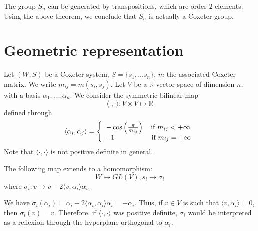 \begin{example}
The group $S_n$ can be generated by transpositions, which are order $2$ elements. Using the above theorem, we conclude that $S_n$ is actually a Coxeter group.
\end{example}

\section{Geometric representation}

Let $(W, S)$ be a Coxeter system, $S = \{s_1, \ldots s_n \}$, $m$ the associated Coxeter matrix. We write $m_{ij} = m(s_i, s_j)$. Let $V$ be a $\mathbb{R}$-vector space of dimension $n$, with a basis $\alpha_1, \ldots , \alpha_n$. We consider the symmetric bilinear map
\begin{equation}
\langle \cdot, \cdot \rangle : V \times V \mapsto \mathbb{R}
\end{equation} defined through
\begin{equation}
\langle \alpha_i , \alpha_j \rangle = \left \{
\begin{array}{c @{} c}
    &- \cos \left(\frac{\pi}{m_{ij}} \right) \quad \text{if } m_{ij} < + \infty \\
    &-1 \quad ~~~~~~~~~~~~~\text{if } m_{ij} = + \infty \\
\end{array}
\right.
\end{equation} Note that $\langle \cdot, \cdot \rangle$ is not positive definite in general.

\begin{proposition}
The following map extends to a homomorphism:
\begin{equation}
W \mapsto GL(V), s_i \to \sigma_i
\end{equation} where $\sigma_i :v \to  v - 2 \langle v, \alpha_i \rangle \alpha_i$.
\end{proposition}

\begin{remark}
We have $\sigma_i (\alpha_i) = \alpha_i - 2 \langle \alpha_i, \alpha_i \rangle \alpha_i = - \alpha_i$. Thus, if $v\in V$ is such that $\langle v, \alpha_i \rangle = 0$, then $\sigma_i (v) = v$. Therefore, if $\langle \cdot, \cdot \rangle$ was positive definite, $\sigma_i$ would be interpreted as a reflexion through the hyperplane orthogonal to $\alpha_i$.
\end{remark}

